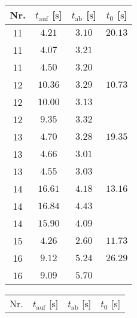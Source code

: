 \begin{table}[H]
   \begin{minipage}[t]{0.5\linewidth}
       \begin{center}
           \captionsetup{width=0.9\linewidth}
           \begin{tabular}{cccc}
               \toprule
               {Nr.} & {$t_{\mathup{auf}}$ [$\si{\second}$]} & {$t_{\mathup{ab}}$ [$\si{\second}$]} & {$t_0$ [$\si{\second}$]}\\
               \midrule
               11 & $ 4.21$ & $3.10$ & $20.13$ \\
               11 & $ 4.07$ & $3.21$ &         \\
               11 & $ 4.50$ & $3.20$ &         \\
               12 & $10.36$ & $3.29$ & $10.73$ \\
               12 & $10.00$ & $3.13$ &         \\
               12 & $ 9.35$ & $3.32$ &         \\
               13 & $ 4.70$ & $3.28$ & $19.35$ \\
               13 & $ 4.66$ & $3.01$ &         \\
               13 & $ 4.55$ & $3.03$ &         \\
               14 & $16.61$ & $4.18$ & $13.16$ \\
               14 & $16.84$ & $4.43$ &         \\
               14 & $15.90$ & $4.09$ &         \\
               15 & $ 4.26$ & $2.60$ & $11.73$ \\
               16 & $ 9.12$ & $5.24$ & $26.29$ \\
               16 & $ 9.09$ & $5.70$ &         \\
               \bottomrule
           \end{tabular}
           \label{tab:240V}
       \end{center}
   \end{minipage}
   \hfill
   \begin{minipage}[t]{0.5\linewidth}
       \begin{center}
           \captionsetup{width=0.9\linewidth}
           \begin{tabular}{cccc}
               \toprule
               {Nr.} & {$t_{\mathup{auf}}$ [$\si{\second}$]} & {$t_{\mathup{ab}}$ [$\si{\second}$]} & {$t_0$ [$\si{\second}$]}\\

\end{tabular}
\end{center}
\end{minipage}
\end{table}
